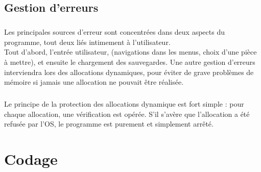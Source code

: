 \documentclass{report}
\begin{document}
    \section*{Gestion d'erreurs} %
        \paragraph*{}
        Les principales sources d'erreur sont concentrées dans deux aspects du programme, tout deux liés intimement à l'utilisateur.\\
        Tout d'abord, l'entrée utilisateur, (navigations dans les menus, choix d'une pièce à mettre), et ensuite le chargement des sauvegardes.
        Une autre gestion d'erreurs interviendra lors des allocations dynamiques, pour éviter de grave problèmes de mémoire si jamais une allocation ne pouvait être réalisée.

        \paragraph*{} %

        \paragraph*{} %

        \paragraph*{} %
        Le principe de la protection des allocations dynamique est fort simple : pour chaque allocation, une vérification est opérée. S'il s'avère que l'allocation a été refusée par l'OS,
        le programme est purement et simplement arrêté.



\chapter{Codage} %
\end{document}
